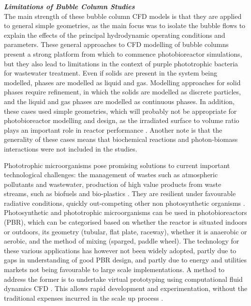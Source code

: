 \textbf{\textit{Limitations of Bubble Column Studies}}\\
The main strength of these bubble column CFD models is that they are applied to general simple geometries, as the main focus was to isolate the bubble flows to explain the effects of the principal hydrodynamic operating conditions and parameters. These general approaches to CFD modelling of bubble columns present a strong platform from which to commence photobioreactor simulations, but they also lead to limitations in the context of purple phototrophic bacteria for wastewater treatment. Even if solids are present in the system being modelled, phases are modelled as liquid and gas. Modelling approaches for solid phases require refinement, in which the solids are modelled as discrete particles, and the liquid and gas phases are modelled as continuous phases. In addition, these cases used simple geometries, which will probably not be appropriate for photobioreactor modelling and design, as the irradiated surface to volume ratio plays an important role in reactor performance \cite{Soman2015}. Another note is that the generality of these cases means that biochemical reactions and photon-biomass interactions were not included in the studies. 





Phototrophic microorganisms pose promising solutions to current important technological challenges: the management of wastes such as atmospheric pollutants and wastewater, production of high value products from waste streams, such as biofuels and bio-plastics \cite{Hulsen2016}. They are resilient under favourable radiative conditions, quickly out-competing other non photosynthetic organisms \cite{Posten2009}. Photosynthetic and phototrophic microorganisms can be used in photobioreactors (PBR), which can be categorised based on whether the reactor is situated indoors or outdoors, its geometry (tubular, flat plate, raceway), whether it is anaerobic or aerobic, and the method of mixing (sparged, paddle wheel). The technology for these various applications has however not been widely adopted, partly due to gaps in understanding of good PBR design, and partly due to energy and utilities markets not being favourable to large scale implementations. A method to address the former is to undertake virtual prototyping using computational fluid dynamics CFD \cite{Bitog2011}. This allows rapid development and experimentation, without the traditional expenses incurred in the scale up process \cite{Bridgeman2012}.

